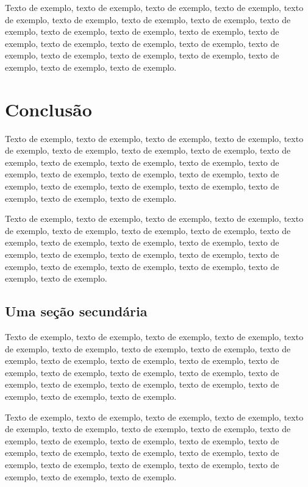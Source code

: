 \documentclass[
	12pt,				%
	oneside,			%
	a4paper,			%
	english,			%
	brazil				%
	]{abntex2ppgsi}
\begin{document}
Texto de exemplo, texto de exemplo, texto de exemplo, texto de exemplo, texto de exemplo, texto de exemplo, texto de exemplo, texto de exemplo, texto de exemplo, texto de exemplo, texto de exemplo, texto de exemplo, texto de exemplo, texto de exemplo, texto de exemplo, texto de exemplo, texto de exemplo, texto de exemplo, texto de exemplo, texto de exemplo, texto de exemplo, texto de exemplo, texto de exemplo.

\chapter{Conclusão}

Texto de exemplo, texto de exemplo, texto de exemplo, texto de exemplo, texto de exemplo, texto de exemplo, texto de exemplo, texto de exemplo, texto de exemplo, texto de exemplo, texto de exemplo, texto de exemplo, texto de exemplo, texto de exemplo, texto de exemplo, texto de exemplo, texto de exemplo, texto de exemplo, texto de exemplo, texto de exemplo, texto de exemplo, texto de exemplo, texto de exemplo.

Texto de exemplo, texto de exemplo, texto de exemplo, texto de exemplo, texto de exemplo, texto de exemplo, texto de exemplo, texto de exemplo, texto de exemplo, texto de exemplo, texto de exemplo, texto de exemplo, texto de exemplo, texto de exemplo, texto de exemplo, texto de exemplo, texto de exemplo, texto de exemplo, texto de exemplo, texto de exemplo, texto de exemplo, texto de exemplo.

\section{Uma seção secundária}

Texto de exemplo, texto de exemplo, texto de exemplo, texto de exemplo, texto de exemplo, texto de exemplo, texto de exemplo, texto de exemplo, texto de exemplo, texto de exemplo, texto de exemplo, texto de exemplo, texto de exemplo, texto de exemplo, texto de exemplo, texto de exemplo, texto de exemplo, texto de exemplo, texto de exemplo, texto de exemplo, texto de exemplo, texto de exemplo, texto de exemplo.

Texto de exemplo, texto de exemplo, texto de exemplo, texto de exemplo, texto de exemplo, texto de exemplo, texto de exemplo, texto de exemplo, texto de exemplo, texto de exemplo, texto de exemplo, texto de exemplo, texto de exemplo, texto de exemplo, texto de exemplo, texto de exemplo, texto de exemplo, texto de exemplo, texto de exemplo, texto de exemplo, texto de exemplo, texto de exemplo, texto de exemplo.
\end{document}
